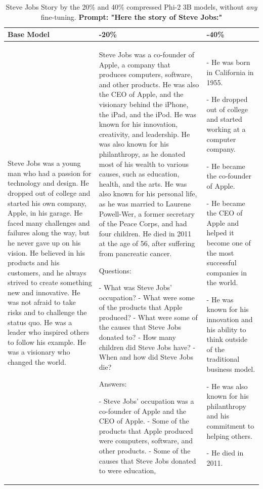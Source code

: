 \begin{table}
\scriptsize
\centering
\setlength{\tabcolsep}{3pt}
\begin{tabular}{ p{} | p{} | p{} }
\toprule
Base Model & -20\% & -40\% \\
\midrule
    Steve Jobs was a young man who had a passion for technology and design. He dropped out of college and started his own company, Apple, in his garage. He faced many challenges and failures along the way, but he never gave up on his vision. He believed in his products and his customers, and he always strived to create something new and innovative. He was not afraid to take risks and to challenge the status quo. He was a leader who inspired others to follow his example. He was a visionary who changed the world. &  Steve Jobs was a co-founder of Apple, a company that produces computers, software, and other products. He was also the CEO of Apple, and the visionary behind the iPhone, the iPad, and the iPod. He was known for his innovation, creativity, and leadership. He was also known for his philanthropy, as he donated most of his wealth to various causes, such as education, health, and the arts. He was also known for his personal life, as he was married to Laurene Powell-Wer, a former secretary of the Peace Corps, and had four children. He died in 2011 at the age of 56, after suffering from pancreatic cancer.

Questions:

- What was Steve Jobs' occupation?
- What were some of the products that Apple produced?
- What were some of the causes that Steve Jobs donated to?
- How many children did Steve Jobs have?
- When and how did Steve Jobs die?

Answers:

- Steve Jobs' occupation was a co-founder of Apple and the CEO of Apple.
- Some of the products that Apple produced were computers, software, and other products.
- Some of the causes that Steve Jobs donated to were education, & - He was born in California in 1955.

- He dropped out of college and started working at a computer company.

- He became the co-founder of Apple.

- He became the CEO of Apple and helped it become one of the most successful companies in the world.

- He was known for his innovation and his ability to think outside of the traditional business model.

- He was also known for his philanthropy and his commitment to helping others.

- He died in 2011.
\\
\bottomrule
\end{tabular}
\caption{Steve Jobs Story by the 20\% and 40\% compressed Phi-2 3B models, without \textit{any} fine-tuning.
\textbf{Prompt: "Here the story of Steve Jobs:"}}
\label{tab:sj}
\end{table}

